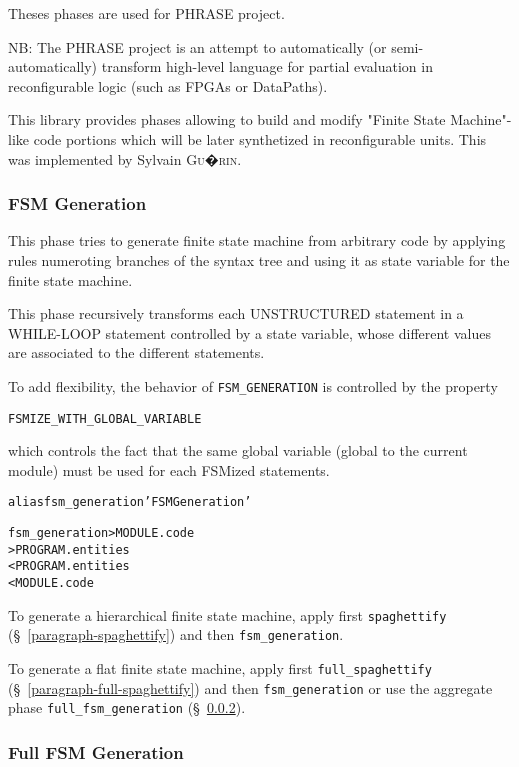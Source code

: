 \documentclass[a4paper]{report}
\newenvironment{PipsMake}{\begin{alltt}}{\end{alltt}}
\begin{document}
Theses phases are used for PHRASE project.

NB: The PHRASE project is an attempt to automatically (or semi-automatically)
transform high-level language for partial evaluation in reconfigurable
logic (such as FPGAs or DataPaths).

This library provides phases allowing to build and modify "Finite State
Machine"-like code portions which will be later synthetized in
reconfigurable units. This was implemented by Sylvain \textsc{Gu�rin}.

\subsubsection{FSM Generation}
\label{paragraph-fsm-generation}

This phase tries to generate finite state machine from arbitrary code by
applying rules numeroting branches of the syntax tree and using it as
state variable for the finite state machine.

This phase recursively transforms each UNSTRUCTURED statement in a
WHILE-LOOP statement controlled by a state variable, whose different
values are associated to the different statements.

To add flexibility, the behavior of \texttt{FSM\_GENERATION} is
controlled by the property
\begin{center}
\verb|FSMIZE_WITH_GLOBAL_VARIABLE|
\end{center}
which controls the fact that the same global variable (global to the
current module) must be used for each FSMized statements.

\begin{PipsMake}
alias fsm_generation 'FSM Generation'

fsm_generation        > MODULE.code
                      > PROGRAM.entities
        < PROGRAM.entities
        < MODULE.code
\end{PipsMake}

To generate a hierarchical finite state machine, apply first
\texttt{spaghettify} (\S~\ref{paragraph-spaghettify}) and then
\verb|fsm_generation|.

To generate a flat finite state machine, apply first
\verb|full_spaghettify| (\S~\ref{paragraph-full-spaghettify}) and then
\verb|fsm_generation| or use the aggregate phase
\verb|full_fsm_generation| (\S~\ref{paragraph-full-fsm-generation}).


\subsubsection{Full FSM Generation}
\label{paragraph-full-fsm-generation}
\end{document}
